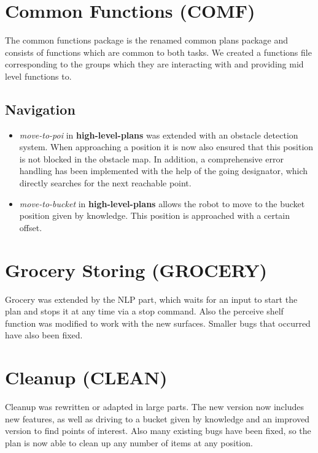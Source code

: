 \documentclass[main.tex]{subfiles}
\begin{document}
                \section{Common Functions (COMF)}
	                The common functions package is the renamed common plans package and consists of functions which are common to both tasks. We created a functions file corresponding to the groups which they are interacting with and providing mid level functions to.
	               
                \subsection{Navigation}
                  \begin{itemize}
                    \item \textit{move-to-poi} in \textbf{high-level-plans} was extended with an obstacle detection system. When approaching a position it is now also ensured that this position is not blocked in the obstacle map. In addition, a comprehensive error handling has been implemented with the help of the going designator, which directly searches for the next reachable point.
                    
                     \item \textit{move-to-bucket} in \textbf{high-level-plans} allows the robot to move to the bucket position given by knowledge. This position is approached with a certain offset.
                  \end{itemize}
                
                \section{Grocery Storing (GROCERY)}
                Grocery was extended by the NLP part, which waits for an input to start the plan and stops it at any time via a stop command. Also the perceive shelf function was modified to work with the new surfaces. Smaller bugs that occurred have also been fixed.
                
                \section{Cleanup (CLEAN)}
                Cleanup was rewritten or adapted in large parts. The new version now includes new features, as well as driving to a bucket given by knowledge and an improved version to find points of interest. Also many existing bugs have been fixed, so the plan is now able to clean up any number of items at any position.
                

	
\end{document}
